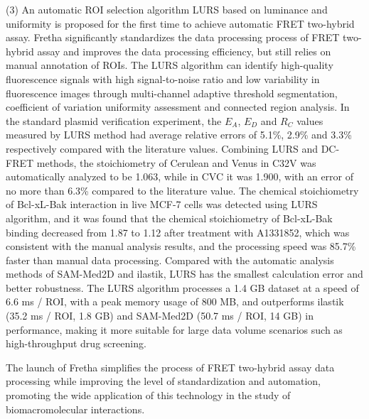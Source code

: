 \begin{eabstract}
(3) An automatic ROI selection algorithm LURS based on luminance and uniformity is proposed for the first time to achieve automatic FRET two-hybrid assay.
Fretha significantly standardizes the data processing process of FRET two-hybrid assay and improves the data processing efficiency, but still relies on manual annotation of ROIs.
The LURS algorithm can identify high-quality fluorescence signals with high signal-to-noise ratio and low variability in fluorescence images through multi-channel adaptive threshold segmentation, coefficient of variation uniformity assessment and connected region analysis.
In the standard plasmid verification experiment, the $E_{A}$, $E_{D}$ and $R_C$ values measured by LURS method had average relative errors of 5.1\%, 2.9\% and 3.3\% respectively compared with the literature values.
Combining LURS and DC-FRET methods, the stoichiometry of Cerulean and Venus in C32V was automatically analyzed to be 1.063, while in CVC it was 1.900, with an error of no more than 6.3\% compared to the literature value.
The chemical stoichiometry of Bcl-xL-Bak interaction in live MCF-7 cells was detected using LURS algorithm, and it was found that the chemical stoichiometry of Bcl-xL-Bak binding decreased from 1.87 to 1.12 after treatment with A1331852, which was consistent with the manual analysis results, and the processing speed was 85.7\% faster than manual data processing.
Compared with the automatic analysis methods of SAM-Med2D and ilastik, LURS has the smallest calculation error and better robustness.
The LURS algorithm processes a 1.4 GB dataset at a speed of 6.6 ms / ROI, with a peak memory usage of 800 MB, and outperforms ilastik (35.2 ms / ROI, 1.8 GB) and SAM-Med2D (50.7 ms / ROI, 14 GB) in performance, making it more suitable for large data volume scenarios such as high-throughput drug screening.

The launch of Fretha simplifies the process of FRET two-hybrid assay data processing while improving the level of standardization and automation, promoting the wide application of this technology in the study of biomacromolecular interactions.
\end{eabstract}

